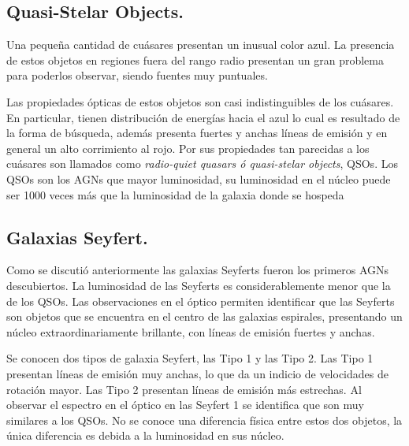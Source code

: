 	\subsection{Quasi-Stelar Objects.}
	\label{subsec:Quasi-Stelar_Objects}

Una pequeña cantidad de cuásares presentan un inusual color azul. La presencia de estos objetos en regiones fuera del rango radio presentan un gran problema para poderlos observar, siendo fuentes muy puntuales.

Las propiedades ópticas de estos objetos son casi indistinguibles de los cuásares. En particular, tienen distribución de energías hacia el azul lo cual es resultado de la forma de búsqueda, además presenta fuertes y anchas líneas de emisión y en general un alto corrimiento al rojo. Por sus propiedades tan parecidas a los cuásares son llamados como {\textit{radio-quiet quasars ó quasi-stelar objects}}, QSOs. Los QSOs son los AGNs que mayor luminosidad, su luminosidad en el núcleo puede ser 1000 veces más que la luminosidad de la galaxia donde se hospeda 

	\subsection{Galaxias Seyfert.}
	\label{subsec:Seyfert_Galaxy}

Como se discutió anteriormente las galaxias Seyferts fueron los primeros AGNs descubiertos. La luminosidad de las Seyferts es considerablemente menor que la de los QSOs. Las observaciones en el óptico permiten identificar que las Seyferts son objetos que se encuentra en el centro de las galaxias espirales, presentando un núcleo extraordinariamente brillante, con líneas de emisión  fuertes y anchas.

Se conocen dos tipos de galaxia Seyfert, las Tipo 1 y las Tipo 2. Las Tipo 1 presentan líneas de emisión muy anchas, lo que da un indicio de velocidades de rotación mayor. Las Tipo 2 presentan líneas de emisión más estrechas. Al observar el espectro en el óptico en las Seyfert 1 se identifica que son muy similares a los QSOs. No se conoce una diferencia física entre estos dos objetos, la única diferencia es debida a la luminosidad en sus núcleo. 


